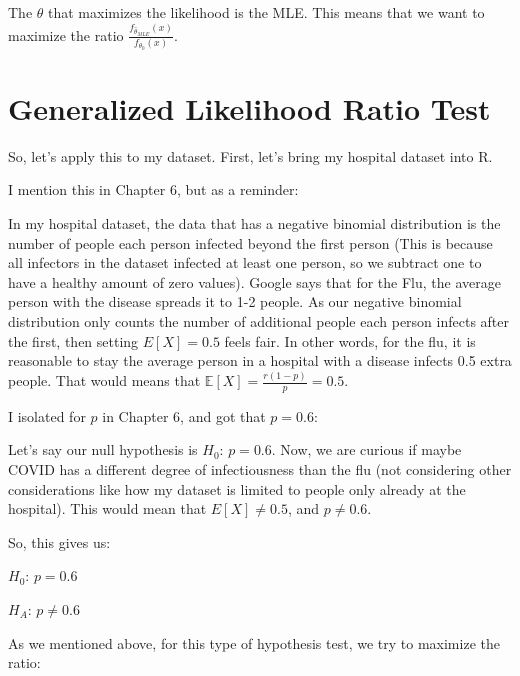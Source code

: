 \documentclass[
  letterpaper,
  DIV=11,
  numbers=noendperiod]{scrreprt}
\newenvironment{Shaded}{\begin{snugshade}}{\end{snugshade}}
\newcommand{\NormalTok}[1]{\textcolor[rgb]{0.00,0.23,0.31}{#1}}
\begin{document}
The \(\theta\) that maximizes the likelihood is the MLE. This means that
we want to maximize the ratio
\(\frac{f_{\hat{\theta}_{MLE}}(x)}{f_{\theta_0}(x)}\).

\section{Generalized Likelihood Ratio
Test}\label{generalized-likelihood-ratio-test-1}

So, let's apply this to my dataset. First, let's bring my hospital
dataset into R.

\begin{Shaded}
\end{Shaded}

I mention this in Chapter 6, but as a reminder:

In my hospital dataset, the data that has a negative binomial
distribution is the number of people each person infected beyond the
first person (This is because all infectors in the dataset infected at
least one person, so we subtract one to have a healthy amount of zero
values). Google says that for the Flu, the average person with the
disease spreads it to 1-2 people. As our negative binomial distribution
only counts the number of additional people each person infects after
the first, then setting \(E[X] = 0.5\) feels fair. In other words, for
the flu, it is reasonable to stay the average person in a hospital with
a disease infects 0.5 extra people. That would means that
\(\mathbb{E}[X] = \frac{r(1-p)}{p} = 0.5\).

I isolated for \(p\) in Chapter 6, and got that \(p = 0.6\):

Let's say our null hypothesis is \(H_0\): \(p = 0.6\). Now, we are
curious if maybe COVID has a different degree of infectiousness than the
flu (not considering other considerations like how my dataset is limited
to people only already at the hospital). This would mean that
\(E[X] \neq 0.5\), and \(p \neq 0.6\).

So, this gives us:

\(H_0\): \(p = 0.6\)

\(H_A\): \(p \neq 0.6\)

As we mentioned above, for this type of hypothesis test, we try to
maximize the ratio:
\end{document}
